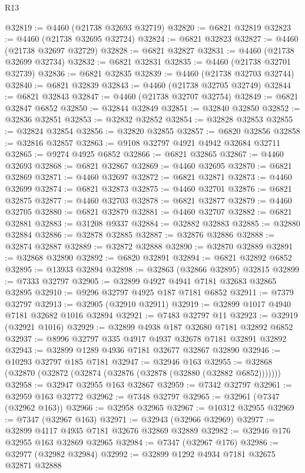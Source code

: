 \begin{lexlean}{R13}
\begin{coremodule}
@32819 := @4460 (@21738 @32693 @32719)
@32820 := @6821 @32819
@32823 := @4460 (@21738 @32695 @32724)
@32824 := @6821 @32823
@32827 := @4460 (@21738 @32697 @32729)
@32828 := @6821 @32827
@32831 := @4460 (@21738 @32699 @32734)
@32832 := @6821 @32831
@32835 := @4460 (@21738 @32701 @32739)
@32836 := @6821 @32835
@32839 := @4460 (@21738 @32703 @32744)
@32840 := @6821 @32839
@32843 := @4460 (@21738 @32705 @32749)
@32844 := @6821 @32843
@32847 := @4460 (@21738 @32707 @32754)
@32849 := @6821 @32847 @6852
@32850 := @32844 @32849
@32851 := @32840 @32850
@32852 := @32836 @32851
@32853 := @32832 @32852
@32854 := @32828 @32853
@32855 := @32824 @32854
@32856 := @32820 @32855
@32857 := @6820 @32856
@32858 := @32816 @32857
@32863 := @9108 @32797 @4921 @4942 @32684 @32711
@32865 := @9274 @4925 @6852
@32866 := @6821 @32865
@32867 := @4460 @32693
@32868 := @6821 @32867
@32869 := @4460 @32695
@32870 := @6821 @32869
@32871 := @4460 @32697
@32872 := @6821 @32871
@32873 := @4460 @32699
@32874 := @6821 @32873
@32875 := @4460 @32701
@32876 := @6821 @32875
@32877 := @4460 @32703
@32878 := @6821 @32877
@32879 := @4460 @32705
@32880 := @6821 @32879
@32881 := @4460 @32707
@32882 := @6821 @32881
@32883 := @31208 @9337
@32884 := @32882 @32883
@32885 := @32880 @32884
@32886 := @32878 @32885
@32887 := @32876 @32886
@32888 := @32874 @32887
@32889 := @32872 @32888
@32890 := @32870 @32889
@32891 := @32868 @32890
@32892 := @6820 @32891
@32894 := @6821 @32892 @6852
@32895 := @13933 @32894
@32898 := @32863 (@32866 @32895) @32815
@32899 := @7333 @32797
@32905 := @32899 @4927 @4941 @7181 @32683 @32865 @32895
@32910 := @9296 @32797 @4925 @187 @7181 @6852
@32911 := @7379 @32797
@32913 := @32905 (@32910 @32911)
@32919 := @32899 @1017 @4940 @7181 @32682 @1016 @32894
@32921 := @7483 @32797 @11
@32923 := @32919 (@32921 @1016)
@32929 := @32899 @4938 @187 @32680 @7181 @32892 @6852
@32937 := @8996 @32797 @335 @4917 @4937 @32678 @7181 @32891 @32892
@32943 := @32899 @1289 @4936 @7181 @32677 @32867 @32890
@32946 := @10293 @32797 @185 @7181
@32947 := @32946 @163
@32955 := @32868 (@32870 (@32872 (@32874 (@32876 (@32878 (@32880 (@32882 @6852)))))))
@32958 := @32947 @32955 @163 @32867
@32959 := @7342 @32797
@32961 := @32959 @163 @32772
@32962 := @7348 @32797
@32965 := @32961 (@7347 (@32962 @163))
@32966 := @32958 @32965
@32967 := @10312 @32955
@32969 := @7347 (@32967 @163)
@32971 := @32943 (@32966 @32969)
@32977 := @32899 @4117 @4935 @7181 @32676 @32869 @32889
@32982 := @32946 @176 @32955 @163 @32869 @32965
@32984 := @7347 (@32967 @176)
@32986 := @32977 (@32982 @32984)
@32992 := @32899 @1292 @4934 @7181 @32675 @32871 @32888

\end{coremodule}
\end{lexlean}
